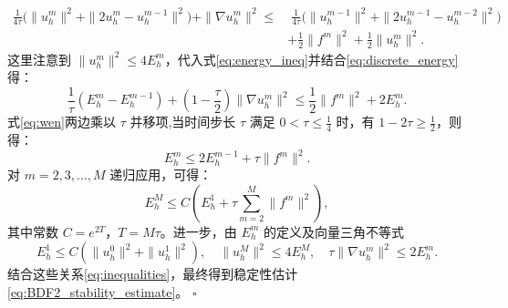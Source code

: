 \documentclass{GZUbachelorthesis}
\makeatletter
\renewcommand{\proofname}{证明}
\renewenvironment{proof}[1][\proofname]{\par
	\normalfont
	\topsep6\p@\@plus6\p@\relax
	\trivlist
	\setlength{\itemindent}{2em}%
	\item[\hskip\labelsep{\songti #1：}]\ignorespaces
}{\hfill\ensuremath{\square}\endtrivlist\@endpefalse}
\theoremstyle{chineseplain}
\makeatother
\begin{document}
\begin{proof}
\begin{equation}
	\label{eq:energy_ineq}
	\begin{aligned}
		\frac{1}{4\tau} \big( \| u_h^m \|^2 + \| 2u_h^m - u_h^{m-1} \|^2 \big) + \| \nabla u_h^m \|^2 
		\leq &\; \frac{1}{4\tau} \big( \| u_h^{m-1} \|^2 + \| 2u_h^{m-1} - u_h^{m-2} \|^2 \big) \\
		& + \frac{1}{2} \| f^m \|^2 + \frac{1}{2} \| u_h^m \|^2.
	\end{aligned}
\end{equation}
	这里注意到 $\| u_h^m \|^2 \leq 4 E_h^m$，代入式\eqref{eq:energy_ineq}并结合\eqref{eq:discrete_energy}得：
\begin{equation}\label{eq:wen}
		\frac{1}{\tau} (E_h^m - E_h^{m-1}) +\left(1-\frac{\tau}{2}\right) \| \nabla u_h^m \|^2 \leq \frac{1}{2} \| f^m \|^2 + 2E_h^m.
\end{equation}
	式\eqref{eq:wen}两边乘以 $\tau$ 并移项,当时间步长 $\tau$ 满足 $0 < \tau \leq \frac{1}{4}$ 时，有 $1 - 2\tau \geq \frac{1}{2}$，则得：
	\begin{equation}\label{eq:final_recursion}
		E_h^m \leq 2 E_h^{m-1} + \tau \| f^m \|^2.
	\end{equation}
	对 $m = 2, 3, \dots, M$ 递归应用，可得：
	\begin{equation}\label{eq:diguishi}
	E_h^M \leq C \left( E_h^1 + \tau \sum_{m=2}^M \| f^m \|^2 \right),
	\end{equation}
	其中常数 $C=e^{2T}$，$T = M\tau$。进一步，由 $E_h^m$ 的定义及向量三角不等式
\begin{equation}
	\label{eq:inequalities}
	E_h^1 \leq C( \| u_h^0 \|^2 + \| u_h^1 \|^2 ),\quad 
	\| u_h^M \|^2 \leq 4E_h^M,\quad 
	\tau \| \nabla u_h^m \|^2 \leq 2E_h^m.
\end{equation}
	结合这些关系\eqref{eq:inequalities}，最终得到稳定性估计\eqref{eq:BDF2_stability_estimate}。
\end{proof}
\end{document}
